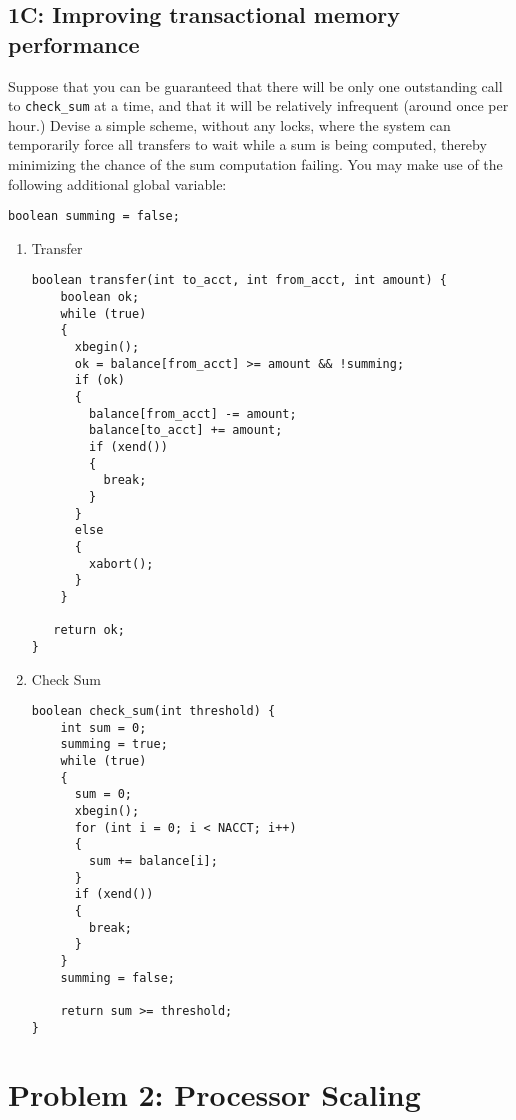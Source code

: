 \documentclass[11pt]{article}
\begin{document}
\newpage

\subsection*{1C: Improving transactional memory performance}

Suppose that you can be guaranteed that there will be only one
outstanding call to \texttt{check\_sum} at a time, and that it will be
relatively infrequent (around once per hour.)  Devise a simple scheme, without any locks,
where the system can temporarily force all transfers to wait
while a sum is being computed, thereby minimizing the
chance of the sum computation failing.  You may make use of the following
additional global variable:

\begin{lstlisting}
boolean summing = false;
\end{lstlisting}

\begin{enumerate}
\item Transfer
\begin{lstlisting}
boolean transfer(int to_acct, int from_acct, int amount) {
    boolean ok;
    while (true)
    {
      xbegin();
      ok = balance[from_acct] >= amount && !summing;
      if (ok)
      {
        balance[from_acct] -= amount;
        balance[to_acct] += amount;
        if (xend())
        {
          break;
        }
      }
      else
      {
        xabort();
      }
    }

   return ok;
}
\end{lstlisting}

\item Check Sum
\begin{lstlisting}
boolean check_sum(int threshold) {
    int sum = 0;
    summing = true;
    while (true)
    {
      sum = 0;
      xbegin();
      for (int i = 0; i < NACCT; i++)
      {
        sum += balance[i];
      }
      if (xend())
      {
        break;
      }
    }
    summing = false;

    return sum >= threshold;
}
\end{lstlisting}
\end{enumerate}

\newpage

\section*{Problem 2: Processor Scaling}
\end{document}

